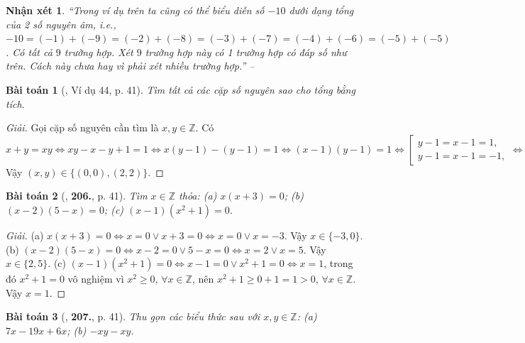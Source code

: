 \documentclass{article}
\numberwithin{equation}{section}
\newtheorem{baitoan}{Bài toán}
\newtheorem{nhanxet}{Nhận xét}[section]
\begin{document}
\begin{nhanxet}
	``Trong ví dụ trên ta cũng có thể biểu diễn số $-10$ dưới dạng tổng của 2 số nguyên âm, i.e., $-10 = (-1) + (-9) = (-2) + (-8) = (-3) + (-7) = (-4) + (-6) = (-5) + (-5)$. Có tất cả $9$ trường hợp. Xét $9$ trường hợp này có 1 trường hợp có đáp số như trên. Cách này chưa hay vì phải xét nhiều trường hợp.'' -- \cite[p. 41]{Tuyen_Toan_6}
\end{nhanxet}

\begin{baitoan}[\cite{Tuyen_Toan_6}, Ví dụ 44, p. 41]
	Tìm tất cả các cặp số nguyên sao cho tổng bằng tích.
\end{baitoan}

\begin{proof}[Giải]
	Gọi cặp số nguyên cần tìm là $x,y\in\mathbb{Z}$. Có
	\begin{equation*}
		x + y = xy\Leftrightarrow xy - x - y + 1 = 1\Leftrightarrow x(y - 1) - (y - 1) = 1\Leftrightarrow(x - 1)(y - 1) = 1\Leftrightarrow\left[\begin{split}
			y - 1 = x - 1 = 1,\\
			y - 1 = x - 1 = -1,
		\end{split}\right.\Leftrightarrow\left[\begin{split}
			x = y = 2,\\
			x = y = 0.
	\end{split}\right.
	\end{equation*}
	Vậy $(x,y)\in\{(0,0),(2,2)\}$.
\end{proof}

\begin{baitoan}[\cite{Tuyen_Toan_6}, \textbf{206.}, p. 41]
	Tìm $x\in\mathbb{Z}$ thỏa: (a) $x(x + 3) = 0$; (b) $(x - 2)(5 - x) = 0$; (c) $(x - 1)(x^2 + 1) = 0$.
\end{baitoan}

\begin{proof}[Giải]
	(a) $x(x + 3) = 0\Leftrightarrow x = 0\lor x + 3 = 0\Leftrightarrow x = 0\lor x = -3$. Vậy $x\in\{-3,0\}$. (b) $(x - 2)(5 - x) = 0\Leftrightarrow x - 2 = 0\lor5 - x = 0\Leftrightarrow x = 2\lor x = 5$. Vậy $x\in\{2,5\}$. (c) $(x - 1)(x^2 + 1) = 0\Leftrightarrow x - 1 = 0\lor x^2 + 1 = 0\Leftrightarrow x = 1$, trong đó $x^2 + 1 = 0$ vô nghiệm vì $x^2\ge 0$, $\forall x\in\mathbb{Z}$, nên $x^2 + 1\ge0 + 1 = 1 > 0$, $\forall x\in\mathbb{Z}$. Vậy $x = 1$.
\end{proof}

\begin{baitoan}[\cite{Tuyen_Toan_6}, \textbf{207.}, p. 41]
	Thu gọn các biểu thức sau với $x,y\in\mathbb{Z}$: (a) $7x - 19x + 6x$; (b) $-xy - xy$.
\end{baitoan}
\end{document}
